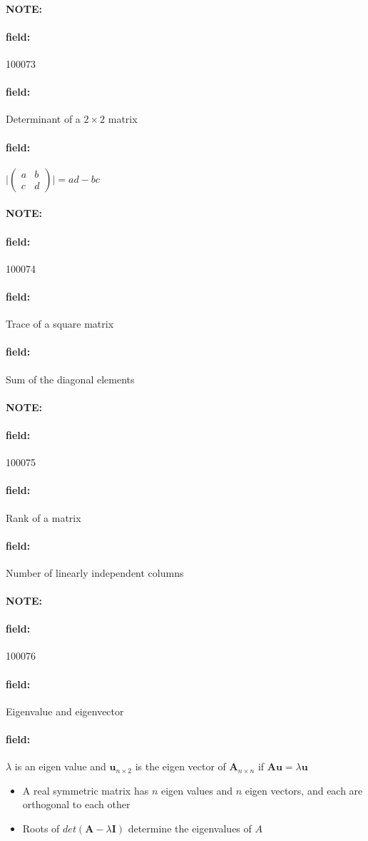 \documentclass[12pt]{article}
\newenvironment{note}{\paragraph{NOTE:}}{}
\newenvironment{field}{\paragraph{field:}}{}
\begin{document}
\begin{note} \begin{field} \tiny 100073 \end{field}
  \begin{field}
    Determinant of a $2\times 2 $ matrix
  \end{field}
  \begin{field}
    $\bigg| \begin{pmatrix}
      a & b \\ c & d
    \end{pmatrix}\bigg| = ad - bc $
  \end{field}
\end{note}

\begin{note} \begin{field} \tiny 100074 \end{field}
  \begin{field}
    Trace of a square matrix
  \end{field}
  \begin{field}
    Sum of the diagonal elements
  \end{field}
\end{note}

\begin{note} \begin{field} \tiny 100075 \end{field}
  \begin{field}
    Rank of a matrix
  \end{field}
  \begin{field}
    Number of linearly independent columns
  \end{field}
\end{note}

\begin{note} \begin{field} \tiny 100076 \end{field}
  \begin{field}
    Eigenvalue and eigenvector
  \end{field}
    \begin{field}
      $\lambda $ is an eigen value and  $\mathbf{u}_{n \times 2}$ is the eigen vector of $\mathbf{A}_{n \times n}$ if $\mathbf{Au} = \lambda \mathbf{u}$
      \begin{itemize}
        \item A real symmetric matrix has $n$ eigen values  and $n$ eigen vectors, and each are orthogonal to each other
        \item Roots of $det(\mathbf{A} - \lambda  \mathbf{I})$ determine the eigenvalues of $A$
      \end{itemize}
    \end{field}
\end{note}
\end{document}
